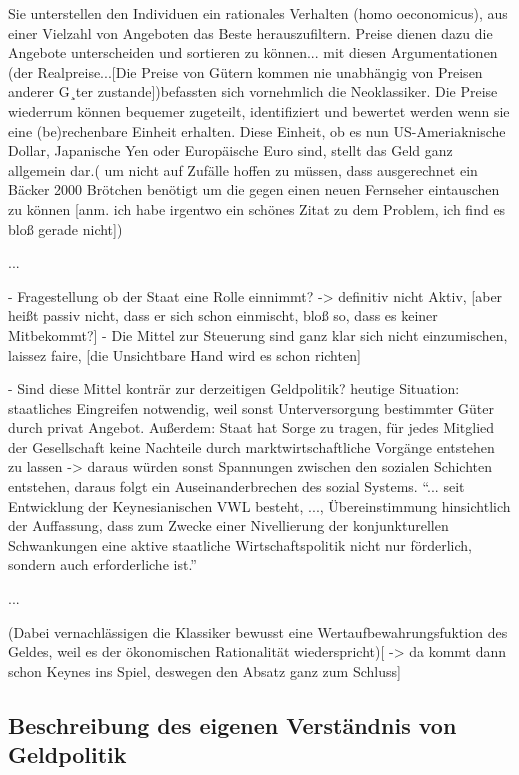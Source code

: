 \documentclass[
onecolumn,
a4paper,
abstracton,
parskip=half
,final
]{scrartcl}
\begin{document}
Sie unterstellen den Individuen ein rationales Verhalten (homo oeconomicus), aus einer
 Vielzahl von Angeboten das Beste herauszufiltern. Preise dienen dazu die Angebote
unterscheiden und sortieren zu k{\"o}nnen... mit diesen Argumentationen  (der Realpreise...[Die
Preise von G{\"u}tern kommen nie unabh{\"a}ngig von Preisen anderer G¸ter zustande])befassten sich
vornehmlich die Neoklassiker. Die Preise wiederrum k{\"o}nnen bequemer zugeteilt,
identifiziert und bewertet werden wenn sie eine (be)rechenbare Einheit erhalten.
Diese Einheit, ob es nun US-Ameriaknische Dollar, Japanische Yen oder Europ{\"a}ische Euro
sind, stellt das Geld ganz allgemein dar.( um nicht auf Zuf{\"a}lle hoffen zu m{\"u}ssen, dass
ausgerechnet ein B{\"a}cker 2000 Br{\"o}tchen ben{\"o}tigt um die gegen einen neuen Fernseher eintauschen zu k{\"o}nnen [anm. ich habe irgentwo ein sch{\"o}nes Zitat zu dem Problem, ich find es blo{\ss} gerade nicht])

...

- Fragestellung ob der Staat eine Rolle einnimmt? -> definitiv nicht Aktiv,
[aber hei{\ss}t passiv nicht, dass er sich schon einmischt, blo{\ss} so, dass es keiner Mitbekommt?]
- Die Mittel zur Steuerung sind ganz klar sich nicht einzumischen, laissez faire,
[die Unsichtbare Hand wird es schon richten]


- Sind diese Mittel kontr{\"a}r zur derzeitigen Geldpolitik?
heutige Situation: staatliches Eingreifen notwendig, weil sonst Unterversorgung bestimmter
G{\"u}ter durch privat Angebot. Au{\ss}erdem: Staat hat Sorge zu tragen, f{\"u}r jedes Mitglied der
Gesellschaft keine Nachteile durch marktwirtschaftliche Vorg{\"a}nge entstehen zu lassen -> daraus
w{\"u}rden sonst Spannungen zwischen den sozialen Schichten entstehen, daraus folgt ein
Auseinanderbrechen des sozial Systems. "`... seit Entwicklung der Keynesianischen VWL besteht,
..., {\"U}bereinstimmung hinsichtlich der Auffassung, dass zum Zwecke einer Nivellierung der
konjunkturellen Schwankungen eine aktive staatliche Wirtschaftspolitik nicht nur f{\"o}rderlich,
 sondern auch erforderliche ist."'

...

(Dabei vernachl{\"a}ssigen die Klassiker bewusst eine Wertaufbewahrungsfuktion des Geldes, weil es
der {\"o}konomischen Rationalit{\"a}t wiederspricht)[ -> da kommt dann schon Keynes ins Spiel, deswegen
den Absatz ganz zum Schluss]



\subsection{Beschreibung des eigenen Verst{\"a}ndnis von Geldpolitik}
\end{document}
